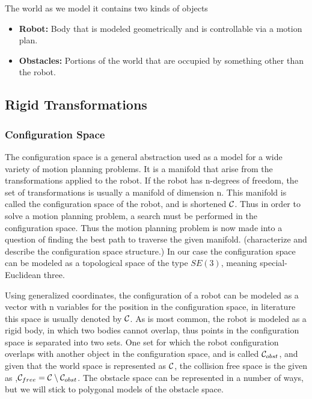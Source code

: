The world as we model it contains two kinds of objects

\begin{itemize}
\item \textbf{Robot:} Body that is modeled geometrically and is controllable via
  a motion plan.
\item \textbf{Obstacles:} Portions of the world that are occupied by something
  other than the robot.
\end{itemize}

\subsection{Rigid Transformations}
\label{sec:rigidtransformations}



\subsubsection{Configuration Space}
\label{sec:configuration-space}
The configuration space is a general abstraction used as a model for a wide
variety of motion planning problems. It is a manifold that arise from the
transformations applied to the robot. If the robot has n-degrees of freedom, the
set of transformations is usually a manifold of dimension n. This manifold is
called the configuration space of the robot, and is shortened \(\mathcal{C}{}\).
Thus in order to solve a motion planning problem, a search must be performed in
the configuration space. Thus the motion planning problem is now made into a
question of finding the best path to traverse the given manifold\cite{Lav06}.
(characterize and describe the configuration space structure.) In our case the
configuration space can be modeled as a topological space of the type \(SE(3)\),
meaning special-Euclidean three.

Using generalized coordinates, the configuration of a robot can be modeled as a
vector with n variables for the position in the configuration space, in
literature this space is usually denoted by \(\mathcal{C}{}\). As is most common,
the robot is modeled as a rigid body, in which two bodies cannot overlap, thus
points in the configuration space is separated into two sets. One set for which
the robot configuration overlaps with another object in the configuration space,
and is called \(\mathcal{C}_{obst}{}\), and given that the world space is
represented as \(\mathcal{C}{}\), the collision free space is the given as
,\(\mathcal{C}_{free} = \mathcal{C} \setminus \mathcal{C}_{obst}\). The obstacle
space can be represented in a number of ways, but we will stick to polygonal
models of the obstacle space.

